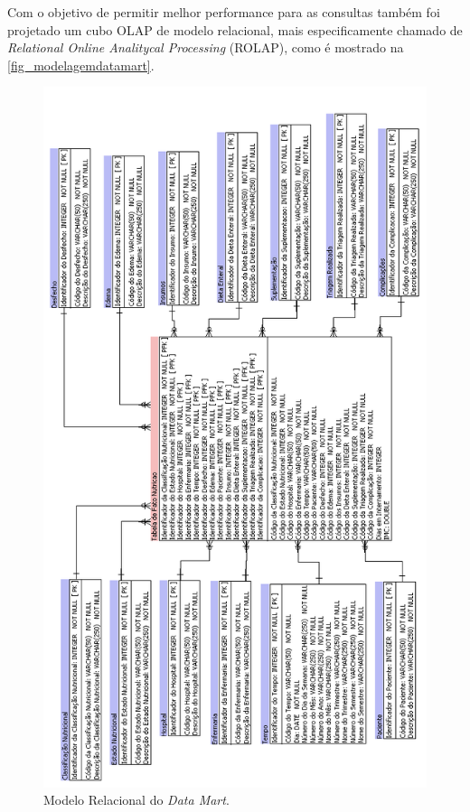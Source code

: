 \newpage
Com o objetivo de permitir melhor performance para as consultas também foi projetado um cubo OLAP de modelo relacional, mais especificamente chamado de \textit{Relational Online Analitycal Processing} (ROLAP), como é mostrado na \autoref{fig_modelagemdatamart}.

\begin{figure}[htb]
	\caption{\label{fig_modelagemdatamart}Modelo Relacional do \textit{Data Mart}.}
	\begin{center}
	    \includegraphics[scale=0.59]{Imagens/figura - modelagem multidimensional datamart.png}
	\end{center}
\end{figure}

